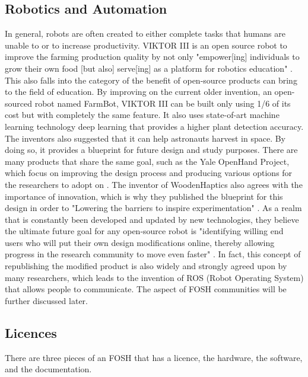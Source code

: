 \documentclass[final-report.tex]{subfiles}
\begin{document}
\subsection{Robotics and Automation}
In general, robots are often created to either complete tasks that humans are unable to or to increase productivity. 
VIKTOR III is an open source robot to improve the farming production quality by not only "empower[ing] individuals to grow their own food [but also] serve[ing] as a platform for robotics education" \cite{arfan2020vision}.
This also falls into the category of the benefit of open-source products can bring to the field of education. By improving on the current older invention, an open-sourced robot named FarmBot, VIKTOR III can be built only using 1/6 of its cost but with completely the same feature. 
It also uses state-of-art machine learning technology deep learning that provides a higher plant detection accuracy. 
The inventors also suggested that it can help astronauts harvest in space. 
By doing so, it provides a blueprint for future design and study purposes. 
There are many products that share the same goal, such as the Yale OpenHand Project, which focus on improving the design process and producing various options for the researchers to adopt on \cite{ma2017yale}. 
The inventor of WoodenHaptics also agrees with the importance of innovation, which is why they published the blueprint for this design in order to "Lowering the barriers to inspire experimentation" \cite{yip2017spurring}. 
As a realm that is constantly been developed and updated by new technologies, they believe the ultimate future goal for any open-source robot is "identifying willing end users who will put their own design modifications online, thereby allowing progress in the research community to move even faster" \cite{yip2017spurring}. 
In fact, this concept of republishing the modified product is also widely and strongly agreed upon by many researchers, which leads to the invention of ROS\cite{alami2018influencers} (Robot Operating System) that allows people to communicate. 
The aspect of FOSH communities will be further discussed later. 

\subsection{Licences}
There are three pieces of an FOSH that has a licence, the hardware, the software, and the documentation.
\end{document}
